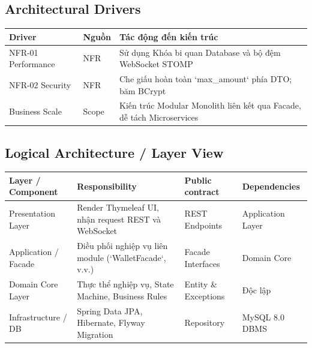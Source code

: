 \documentclass[11pt,a4paper]{article}
\begin{document}
\subsection{Architectural Drivers}
\begin{table}[H]
    \centering
    \small
    \begin{tabularx}{\textwidth}{|l|l|X|}
        \hline
        \textbf{Driver} & \textbf{Nguồn} & \textbf{Tác động đến kiến trúc} \\ \hline
        NFR-01 Performance & NFR & Sử dụng Khóa bi quan Database và bộ đệm WebSocket STOMP \\ \hline
        NFR-02 Security & NFR & Che giấu hoàn toàn `max_amount` phía DTO; băm BCrypt \\ \hline
        Business Scale & Scope & Kiến trúc Modular Monolith liên kết qua Facade, dễ tách Microservices \\ \hline
    \end{tabularx}
\end{table}

\subsection{Logical Architecture / Layer View}
\begin{table}[H]
    \centering
    \small
    \begin{tabularx}{\textwidth}{|l|X|l|l|}
        \hline
        \textbf{Layer / Component} & \textbf{Responsibility} & \textbf{Public contract} & \textbf{Dependencies} \\ \hline
        Presentation Layer & Render Thymeleaf UI, nhận request REST và WebSocket & REST Endpoints & Application Layer \\ \hline
        Application / Facade & Điều phối nghiệp vụ liên module (`WalletFacade`, v.v.) & Facade Interfaces & Domain Core \\ \hline
        Domain Core Layer & Thực thể nghiệp vụ, State Machine, Business Rules & Entity \& Exceptions & Độc lập \\ \hline
        Infrastructure / DB & Spring Data JPA, Hibernate, Flyway Migration & Repository & MySQL 8.0 DBMS \\ \hline
    \end{tabularx}
\end{table}
\end{document}
